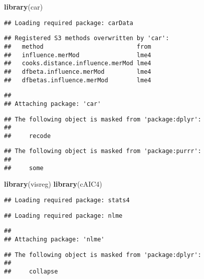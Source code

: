 \documentclass[
]{article}
\newenvironment{Shaded}{\begin{snugshade}}{\end{snugshade}}
\newcommand{\KeywordTok}[1]{\textcolor[rgb]{0.13,0.29,0.53}{\textbf{#1}}}
\newcommand{\NormalTok}[1]{#1}
\begin{document}
\begin{Shaded}
\begin{Highlighting}[]
\KeywordTok{library}\NormalTok{(car)}
\end{Highlighting}
\end{Shaded}

\begin{verbatim}
## Loading required package: carData
\end{verbatim}

\begin{verbatim}
## Registered S3 methods overwritten by 'car':
##   method                          from
##   influence.merMod                lme4
##   cooks.distance.influence.merMod lme4
##   dfbeta.influence.merMod         lme4
##   dfbetas.influence.merMod        lme4
\end{verbatim}

\begin{verbatim}
## 
## Attaching package: 'car'
\end{verbatim}

\begin{verbatim}
## The following object is masked from 'package:dplyr':
## 
##     recode
\end{verbatim}

\begin{verbatim}
## The following object is masked from 'package:purrr':
## 
##     some
\end{verbatim}

\begin{Shaded}
\begin{Highlighting}[]
\KeywordTok{library}\NormalTok{(visreg)}
\KeywordTok{library}\NormalTok{(cAIC4)}
\end{Highlighting}
\end{Shaded}

\begin{verbatim}
## Loading required package: stats4
\end{verbatim}

\begin{verbatim}
## Loading required package: nlme
\end{verbatim}

\begin{verbatim}
## 
## Attaching package: 'nlme'
\end{verbatim}

\begin{verbatim}
## The following object is masked from 'package:dplyr':
## 
##     collapse
\end{verbatim}
\end{document}
